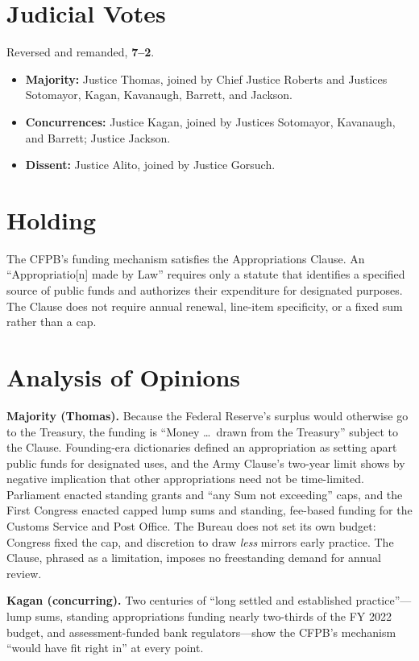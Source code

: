 \documentclass[12pt]{article}
\begin{document}
\section{Judicial Votes}

Reversed and remanded, \textbf{7--2}.
\begin{itemize}
\item \textbf{Majority:} Justice Thomas, joined by Chief Justice Roberts and Justices Sotomayor, Kagan, Kavanaugh, Barrett, and Jackson.
\item \textbf{Concurrences:} Justice Kagan, joined by Justices Sotomayor, Kavanaugh, and Barrett; Justice Jackson.
\item \textbf{Dissent:} Justice Alito, joined by Justice Gorsuch.
\end{itemize}

\section{Holding}

The CFPB's funding mechanism satisfies the Appropriations Clause. An ``Appropriatio[n] made by Law'' requires only a statute that identifies a specified source of public funds and authorizes their expenditure for designated purposes. The Clause does not require annual renewal, line-item specificity, or a fixed sum rather than a cap.

\section{Analysis of Opinions}

\textbf{Majority (Thomas).} Because the Federal Reserve's surplus would otherwise go to the Treasury, the funding is ``Money \ldots\ drawn from the Treasury'' subject to the Clause. Founding-era dictionaries defined an appropriation as setting apart public funds for designated uses, and the Army Clause's two-year limit shows by negative implication that other appropriations need not be time-limited. Parliament enacted standing grants and ``any Sum not exceeding'' caps, and the First Congress enacted capped lump sums and standing, fee-based funding for the Customs Service and Post Office. The Bureau does not set its own budget: Congress fixed the cap, and discretion to draw \textit{less} mirrors early practice. The Clause, phrased as a limitation, imposes no freestanding demand for annual review.

\textbf{Kagan (concurring).} Two centuries of ``long settled and established practice''---lump sums, standing appropriations funding nearly two-thirds of the FY 2022 budget, and assessment-funded bank regulators---show the CFPB's mechanism ``would have fit right in'' at every point.
\end{document}
